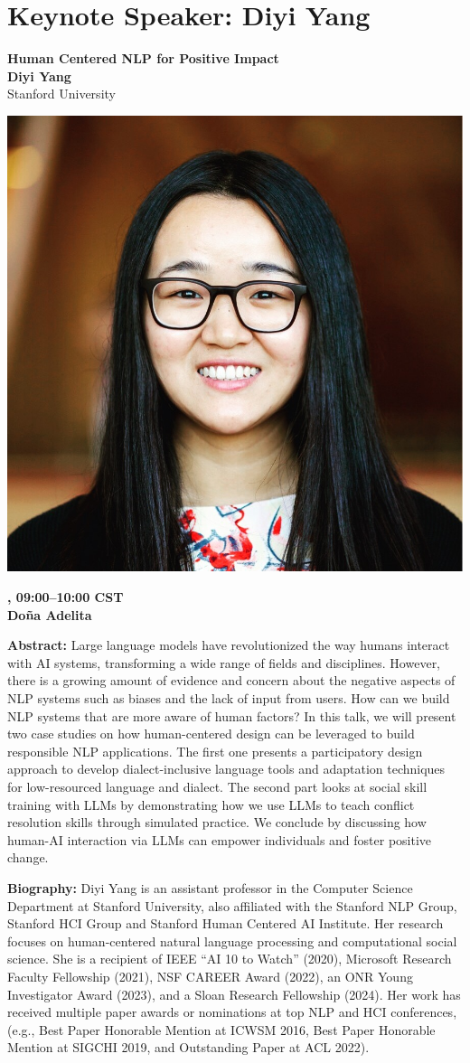 \newpage
\section{Keynote Speaker: Diyi Yang}

\begin{center}
{\bfseries\Large Human Centered NLP for Positive Impact} \\
\vspace{1.0em}
{\large\bf Diyi Yang} \\
Stanford University

\includegraphics[width=0.4\linewidth]{content/mexican_nlp/diyi.jpeg}

\textbf{\daydateyear{}, 09:00--10:00 CST}\\
\textbf{Do\~na Adelita}
\end{center}

\noindent
{\bfseries Abstract:}
Large language models have revolutionized the way humans interact with AI systems, transforming a wide range of fields and disciplines. However, there is a growing amount of evidence and concern about the negative aspects of NLP systems such as biases and the lack of input from users. How can we build NLP systems that are more aware of human factors? In this talk, we will present two case studies on how human-centered design can be leveraged to build responsible NLP applications. The first one presents a participatory design approach to develop dialect-inclusive language tools and adaptation techniques for low-resourced language and dialect. The second part looks at social skill training with LLMs by demonstrating how we use LLMs to teach conflict resolution skills through simulated practice. We conclude by discussing how human-AI interaction via LLMs can empower individuals and foster positive change.

\vspace{1em}

{\bfseries Biography:}
Diyi Yang is an assistant professor in the Computer Science Department at Stanford University, also affiliated with the Stanford NLP Group, Stanford HCI Group and Stanford Human Centered AI Institute. Her research focuses on human-centered natural language processing and computational social science. She is a recipient of IEEE “AI 10 to Watch” (2020), Microsoft Research Faculty Fellowship (2021), NSF CAREER Award (2022), an ONR Young Investigator Award (2023), and a Sloan Research Fellowship (2024). Her work has received multiple paper awards or nominations at top NLP and HCI conferences, (e.g., Best Paper Honorable Mention at ICWSM 2016, Best Paper Honorable Mention at SIGCHI 2019, and Outstanding Paper at ACL 2022).

\newpage
